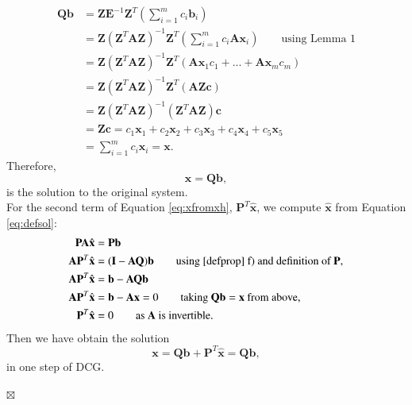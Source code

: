 \documentclass[review]{elsarticle}
\begin{document}
\begin{align*}
\mathbf{Q}\mathbf{b}&=\mathbf{Z}\mathbf{E}^{-1}\mathbf{Z}^T\left(\sum_{i=1}^m {c}_i\mathbf{b}_i\right)\\
&=\mathbf{Z}(\mathbf{Z}^T\mathbf{A}\mathbf{Z})^{-1}\mathbf{Z}^T\left(\sum_{i=1}^m {c}_i\mathbf{A}\mathbf{x}_i\right)\qquad \text{using Lemma 1}\\
&=\mathbf{Z}(\mathbf{Z}^T\mathbf{A}\mathbf{Z})^{-1}\mathbf{Z}^T\left( \mathbf{A}\mathbf{x}_1{c}_1+...+\mathbf{A}\mathbf{x}_m{c}_m\right) \\
&=\mathbf{Z}(\mathbf{Z}^T\mathbf{A}\mathbf{Z})^{-1}\mathbf{Z}^T(\mathbf{A}\mathbf{Z}\mathbf{c})  \\
&=\mathbf{Z}(\mathbf{Z}^T\mathbf{A}\mathbf{Z})^{-1}(\mathbf{Z}^T\mathbf{A}\mathbf{Z})\mathbf{c} \\
&=\mathbf{Z}\mathbf{c}= c_1\mathbf{x}_1+c_2\mathbf{x}_2+c_3\mathbf{x}_3+c_4\mathbf{x}_4+c_5\mathbf{x}_5\\
& =\sum_{i=1}^m {c}_i\mathbf{x}_i=\mathbf{x}.
\end{align*}
Therefore,
\begin{equation}\label{eq:xqb}
\mathbf{x}=\mathbf{Q}\mathbf{b},
\end{equation}
is the solution to the original system.\\ 
For the second term of Equation \eqref{eq:xfromxh}, $\mathbf{P}^T\mathbf{\hat{x}}$, we compute $\mathbf{\hat{x}}$ from Equation \eqref{eq:defsol}:
\begin{align*}
    \mathbf{P}\mathbf{A}\hat{\mathbf{x}}&=\mathbf{P}\mathbf{b}\\
    \mathbf{A}\mathbf{P}^T\hat{\mathbf{x}}&=(\mathbf{I}-\mathbf{A}\mathbf{Q})\mathbf{b} \qquad \text{using \ref{defprop} f) and definition of $\mathbf{P}$,}\\
        \mathbf{A}\mathbf{P}^T\hat{\mathbf{x}}&=\mathbf{b}-\mathbf{A}\mathbf{Q}\mathbf{b}\\
        \mathbf{A}\mathbf{P}^T\hat{\mathbf{x}}&=\mathbf{b}-\mathbf{A}\mathbf{x}=0 \qquad \text{taking $\mathbf{Q}\mathbf{b}=\mathbf{x}$ from above,}\\
          \mathbf{P}^T\hat{\mathbf{x}}&=0 \qquad \text{as $\mathbf{A}$ is invertible.}
\end{align*}
Then we have obtain the solution 
$$\mathbf{x}=\mathbf{Q}\mathbf{b}+\mathbf{P}^T\mathbf{\hat{x}}=\mathbf{Q}\mathbf{b},$$ 
in one step of DCG.
\begin{flushright}
$\boxtimes $                
\end{flushright}
\end{document}
